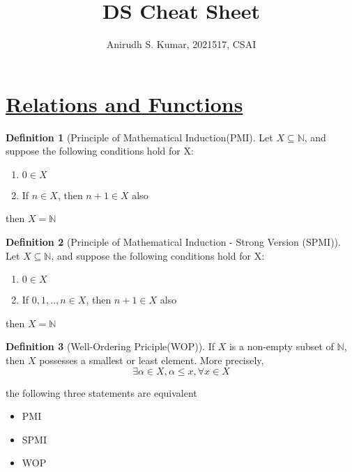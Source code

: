\documentclass{article}
\title{DS Cheat Sheet}
\author{Anirudh S. Kumar, 2021517, CSAI}
\theoremstyle{definition}
\newtheorem*{defi}{Definition}
\theoremstyle{definition}
\newenvironment{manualprop}[1]{%
  \renewcommand\themanualpropinner{#1}%
  \manualpropinner
}{\endmanualpropinner}
\theoremstyle{named}
\begin{document}
\maketitle
\pagestyle{fancy}
\fancyhf{}
\renewcommand{\headrulewidth}{0pt}
\fancyfoot[C]{\thepage}

\section{\underline{Relations and Functions}}

\begin{defi}[Principle of Mathematical Induction(PMI]
Let $X \subseteq \mathbb{N}$, and suppose the following conditions hold for X:
\begin{enumerate}
    \item $0 \in X$
    \item If $n \in X$, then $n+1 \in X$ also
\end{enumerate}
then $X = \mathbb{N}$
\end{defi}


\begin{defi}[Principle of Mathematical Induction - Strong Version (SPMI)]
Let $X \subseteq \mathbb{N}$, and suppose the following conditions hold for X:
\begin{enumerate}
    \item $0 \in X$
    \item If $0,1,.., n \in X$, then $n+1 \in X$ also
\end{enumerate}
then $X = \mathbb{N}$
\end{defi}

\begin{defi}[Well-Ordering Priciple(WOP)]
If $X$ is a non-empty subset of $\mathbb{N}$, then $X$ possesses a smallest or least element. 
More precisely, $$\exists \alpha \in X, \alpha \leq x , \forall x \in X$$ 
\end{defi}

\begin{manualprop}{1}
the following three statements are equivalent
\begin{itemize}
\item PMI
\item SPMI
\item WOP
\end{itemize}
\end{manualprop}
\end{document}
